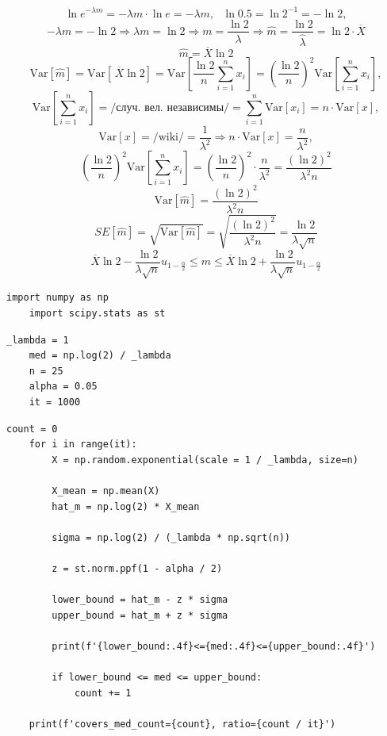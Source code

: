 \documentclass[a4paper, 12pt]{article}
\begin{document}
    $$\ln{e^{-\lambda m}}=-\lambda m\cdot\ln{e}=-\lambda m,\,\,\,\,\ln{0.5}=\ln{2^{-1}}=-\ln{2},$$
    $$-\lambda m=-\ln{2}\Rightarrow\lambda m=\ln{2}\Rightarrow m=\dfrac{\ln{2}}{\lambda}\Rightarrow\hat{m}=\dfrac{\ln{2}}{\hat{\lambda}}=\ln{2}\cdot\overline{X}$$
    $$\hat{m}=\overline{X}\ln{2}$$
    $$\text{Var}\left[\hat{m}\right]=\text{Var}\left[\,\overline{X}\ln{2}\right]=\text{Var}\left[\dfrac{\ln{2}}{n}\sum_{i=1}^{n}x_i\right]=\left(\dfrac{\ln{2}}{n}\right)^2\text{Var}\left[\sum_{i=1}^{n}x_i\right],$$
    $$\text{Var}\left[\sum_{i=1}^{n}x_i\right]=\text{/случ. вел. независимы/}=\sum_{i=1}^{n}\text{Var}\left[x_i\right]=n\cdot\text{Var}\left[x\right],$$
    $$\text{Var}\left[x\right]=\text{/wiki/}=\dfrac{1}{\lambda^2}\Rightarrow n\cdot\text{Var}\left[x\right]=\dfrac{n}{\lambda^2},$$
    $$\left(\dfrac{\ln{2}}{n}\right)^2\text{Var}\left[\sum_{i=1}^{n}x_i\right]=\left(\dfrac{\ln{2}}{n}\right)^2\cdot\dfrac{n}{\lambda^2}=\dfrac{\left(\ln{2}\right)^2}{\lambda^2 n}$$
    $$\text{Var}\left[\hat{m}\right]=\dfrac{\left(\ln{2}\right)^2}{\lambda^2 n}$$
    $$SE\left[\hat{m}\right]=\sqrt{\text{Var}\left[\hat{m}\right]}=\sqrt{\dfrac{\left(\ln{2}\right)^2}{\lambda^2 n}}=\dfrac{\ln{2}}{\lambda\sqrt{n}}$$
    $$\overline{X}\ln{2}-\dfrac{\ln{2}}{\lambda\sqrt{n}}u_{1-\frac{\alpha}{2}}\leq m\leq\overline{X}\ln{2}+\dfrac{\ln{2}}{\lambda\sqrt{n}}u_{1-\frac{\alpha}{2}}$$


    \begin{lstlisting}[label=imps2, caption={import}]
    import numpy as np
    import scipy.stats as st
    \end{lstlisting}


    \begin{lstlisting}[label=vars2, caption={pars}]
    _lambda = 1
    med = np.log(2) / _lambda
    n = 25
    alpha = 0.05
    it = 1000
    \end{lstlisting}


    \begin{lstlisting}[label=code2, caption={code2}]
    count = 0
    for i in range(it):
        X = np.random.exponential(scale = 1 / _lambda, size=n)

        X_mean = np.mean(X)
        hat_m = np.log(2) * X_mean

        sigma = np.log(2) / (_lambda * np.sqrt(n))

        z = st.norm.ppf(1 - alpha / 2)

        lower_bound = hat_m - z * sigma
        upper_bound = hat_m + z * sigma

        print(f'{lower_bound:.4f}<={med:.4f}<={upper_bound:.4f}')

        if lower_bound <= med <= upper_bound:
            count += 1

    print(f'covers_med_count={count}, ratio={count / it}')
    \end{lstlisting}
\end{document}
